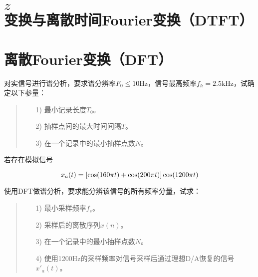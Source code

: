 \documentclass[cn, hazy, blue, normal, 14pt]{elegantnote}
\begin{document}
\section{$z$变换与离散时间Fourier变换（DTFT）}




\section{离散Fourier变换（DFT）}

\begin{exercise}

对实信号进行谱分析，要求谱分辨率$F_0\leq 10\text{Hz}$，信号最高频率$f_h=2.5\text{kHz}$，试确定以下参量：

\begin{quote}
\begin{itemize}
    \item[1)] 最小记录长度$T_0$。
    \item[2)] 抽样点间的最大时间间隔$T$。
    \item[3)] 在一个记录中的最小抽样点数$N$。
\end{itemize}
\end{quote}

\end{exercise}

\begin{solution}[print=false]
    


\end{solution}

\begin{exercise}

若存在模拟信号

\begin{equation}
\notag
    x_a(t)=[\cos(160\pi t)+\cos(200\pi t)]\cos(1200\pi t)
\end{equation}

使用DFT做谱分析，要求能分辨该信号的所有频率分量，试求：

\begin{quote}
\begin{itemize}
    \item[1)] 最小采样频率$f_s$。
    \item[2)] 采样后的离散序列$x(n)$。
    \item[3)] 在一个记录中的最小抽样点数$N$。
    \item[4)] 使用1200Hz的采样频率对信号采样后通过理想D/A恢复的信号$x'_a(t)$。
\end{itemize}
\end{quote}

\end{exercise}
\end{document}
